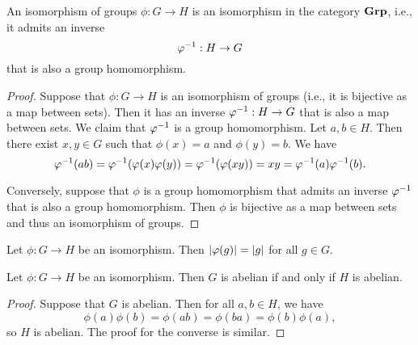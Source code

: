 \begin{theorem}
    An isomorphism of groups \(\phi: G \to H\) is an isomorphism in the category
    \(\mathbf{Grp}\), i.e., it admits an inverse
    \[
        \varphi^{-1} : H \to G
    \]
    that is also a group homomorphism.
\end{theorem}

\begin{proof}
    Suppose that \(\phi: G \to H\) is an isomorphism of groups (i.e., it is
    bijective as a map between sets). Then it has an inverse \(\varphi^{-1} : H \to
    G\) that is also a map between sets. We claim that \(\varphi^{-1}\) is a group
    homomorphism. Let \(a, b \in H\). Then there exist \(x, y \in G\) such that
    \(\phi(x) = a\) and \(\phi(y) = b\). We have
    \[
        \varphi^{-1}(ab) = \varphi^{-1}(\varphi(x)\varphi(y)) = \varphi^{-1}(\varphi(xy)) = xy = \varphi^{-1}(a)\varphi^{-1}(b).
    \]
    
    Conversely, suppose that \(\phi\) is a group homomorphism that admits an
    inverse \(\varphi^{-1}\) that is also a group homomorphism. Then \(\phi\) is
    bijective as a map between sets and thus an isomorphism of groups.
\end{proof}


\begin{theorem}
    Let \(\phi: G \to H\) be an isomorphism. Then \(\lvert \varphi(g) \rvert =
    \lvert g \rvert\) for all \(g \in G\).
\end{theorem}

\begin{theorem}
    Let \(\phi : G \to H\) be an isomorphism. Then \(G\) is abelian if and only
    if \(H\) is abelian.
\end{theorem}

\begin{proof}
    Suppose that \(G\) is abelian. Then for all \(a, b \in H\), we have
    \[
        \phi(a)\phi(b) = \phi(ab) = \phi(ba) = \phi(b)\phi(a),
    \]
    so \(H\) is abelian. The proof for the converse is similar.
\end{proof}

